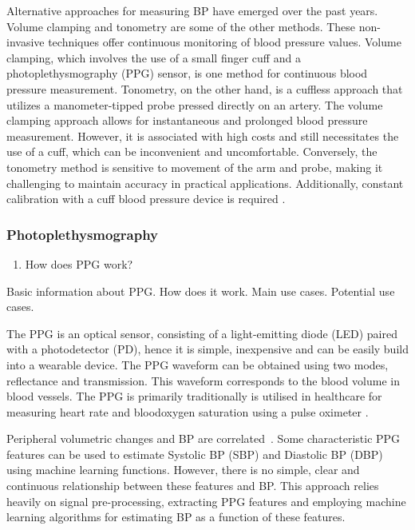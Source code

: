 \documentclass[12pt, bibliography=totoc]{scrartcl}
\begin{document}
Alternative approaches for measuring BP have emerged over the past years.
Volume clamping \cite{kimBallistocardiogramBasedApproachCuffless2018} and tonometry \cite{imholzFifteenYearsExperience1998} are some of the other methods. These non-invasive techniques offer continuous monitoring of blood pressure values. 
Volume clamping, which involves the use of a small finger cuff and a photoplethysmography (PPG) sensor, is one method for continuous blood pressure measurement. Tonometry, on the other hand, is a cuffless approach that utilizes a manometer-tipped probe pressed directly on an artery.
The volume clamping approach allows for instantaneous and prolonged blood pressure measurement. However, it is associated with high costs and still necessitates the use of a cuff, which can be inconvenient and uncomfortable. Conversely, the tonometry method is sensitive to movement of the arm and probe, making it challenging to maintain accuracy in practical applications. Additionally, constant calibration with a cuff blood pressure device is required \cite{peterReviewMethodsNoninvasive2014}.

\subsubsection{Photoplethysmography}

\begin{enumerate}
\item How does PPG work?
\end{enumerate}

Basic information about PPG. How does it work. Main use cases. Potential use cases.

The PPG is an optical sensor, consisting of a light-emitting diode (LED) paired with a photodetector (PD), hence it is simple, inexpensive and can be easily build into a wearable device. The PPG waveform can be obtained using two modes, reflectance and transmission. This waveform corresponds to the blood volume in blood vessels. The PPG is primarily traditionally is utilised in healthcare for measuring heart rate and bloodoxygen saturation using a pulse oximeter \cite{allenPhotoplethysmographyItsApplication2007}.

Peripheral volumetric changes and BP are correlated~\cite{langewoutersPressurediameterRelationshipsSegments1986}.
Some characteristic PPG features can be used to estimate Systolic BP (SBP) and Diastolic BP (DBP) using machine learning functions. However, there is no simple, clear and continuous relationship between these features and BP. This approach relies heavily on signal pre-processing, extracting PPG features and employing machine learning algorithms for estimating BP as a function of these features.
\end{document}
